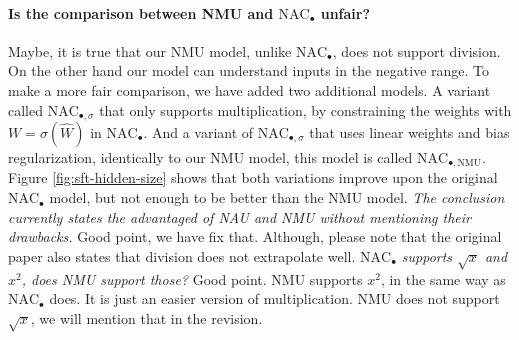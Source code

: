 \documentclass{article}
\begin{document}
\vspace{-0.3cm} \paragraph{Is the comparison between NMU and $\mathrm{NAC}_{\bullet}$ unfair?} %
Maybe, it is true that our NMU model, unlike $\mathrm{NAC}_{\bullet}$, does not support division. On the other hand our model can understand inputs in the negative range. To make a more fair comparison, we have added two additional models. A variant called $\mathrm{NAC}_{\bullet, \sigma}$ that only supports multiplication, by constraining the weights with $W = \sigma(\hat{W})$ in $\mathrm{NAC}_{\bullet}$. And a variant of $\mathrm{NAC}_{\bullet, \sigma}$ that uses linear weights and bias regularization, identically to our NMU model, this model is called $\mathrm{NAC}_{\bullet, \mathrm{NMU}}$. Figure \ref{fig:sft-hidden-size} shows that both variations improve upon the original $\mathrm{NAC}_{\bullet}$ model, but not enough to be better than the NMU model. %
\textit{The conclusion currently states the advantaged of NAU and NMU without mentioning their drawbacks.} Good point, we have fix that. Although, please note that the original paper also states that division does not extrapolate well. %
\textit{$\mathrm{NAC}_{\bullet}$ supports $\sqrt{x}$ and $x^2$, does NMU support those?} Good point. NMU supports $x^2$, in the same way as $\mathrm{NAC}_{\bullet}$ does. It is just an easier version of multiplication. NMU does not support $\sqrt{x}$, we will mention that in the revision.
\end{document}
